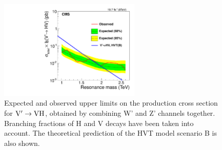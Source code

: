 \begin{figure}[ht!pb]
\begin{center}
\includegraphics[width=0.60\textwidth]{EXO-14-009/figs/brazilianFlag_HV.pdf}
\end{center}
\caption{Expected and observed upper limits on the production cross section
for ${\rm V'\to VH}$,
obtained by combining W' and Z' channels together. 
 Branching fractions of H and V decays 
have been taken into account.
 The theoretical prediction
of the HVT model scenario B is also shown.
}
\label{fig:HWHZ}
\end{figure}



